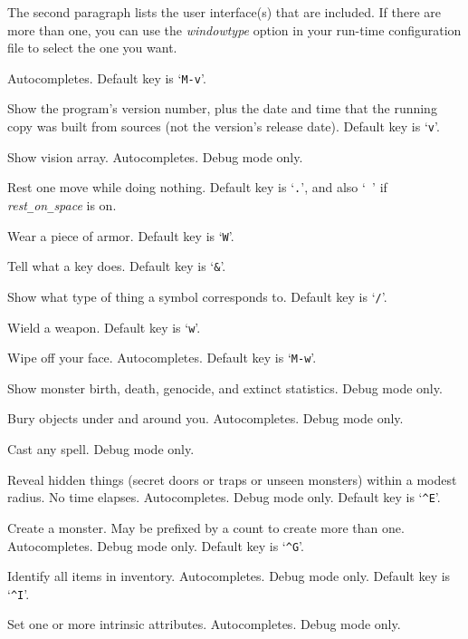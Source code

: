 The second paragraph lists the user interface(s) that are included.
If there are more than one, you can use the {\it windowtype\/}
option in your run-time configuration file to select the one you want.

Autocompletes. Default key is `{\tt M-v}'.
\item[\tb{\#versionshort}]
Show the program's version number, plus the date and time that the
running copy was built from sources (not the version's release date).
Default key is `{\tt v}'.
\item[\tb{\#vision}]
Show vision array.
Autocompletes.
Debug mode only.
\item[\tb{\#wait}]
Rest one move while doing nothing.
Default key is `{\tt .}', and also `{\tt{ }}' if
{\it rest\verb+_+on\verb+_+space\/} is on.
\item[\tb{\#wear}]
Wear a piece of armor. Default key is `{\tt W}'.
\item[\tb{\#whatdoes}]
Tell what a key does. Default key is `{\tt \&}'.
\item[\tb{\#whatis}]
Show what type of thing a symbol corresponds to. Default key is `{\tt /}'.
\item[\tb{\#wield}]
Wield a weapon. Default key is `{\tt w}'.
\item[\tb{\#wipe}]
Wipe off your face. Autocompletes. Default key is `{\tt M-w}'.
\item[\tb{\#wizborn}]
Show monster birth, death, genocide, and extinct statistics.
Debug mode only.
\item[\tb{\#wizbury}]
Bury objects under and around you.
Autocompletes.
Debug mode only.
\item[\tb{\#wizcast}]
Cast any spell.
Debug mode only.
\item[\tb{\#wizdetect}]
Reveal hidden things (secret doors or traps or unseen monsters)
within a modest radius.
No time elapses.
Autocompletes.
Debug mode only.
Default key is `{\tt \^{}E}'.
\item[\tb{\#wizgenesis}]
Create a monster.
May be prefixed by a count to create more than one.
Autocompletes.
Debug mode only.
Default key is `{\tt \^{}G}'.
\item[\tb{\#wizidentify}]
Identify all items in inventory.
Autocompletes.
Debug mode only.
Default key is `{\tt \^{}I}'.
\item[\tb{\#wizintrinsic}]
Set one or more intrinsic attributes.
Autocompletes.
Debug mode only.
\item[\tb{\#wizkill}]

